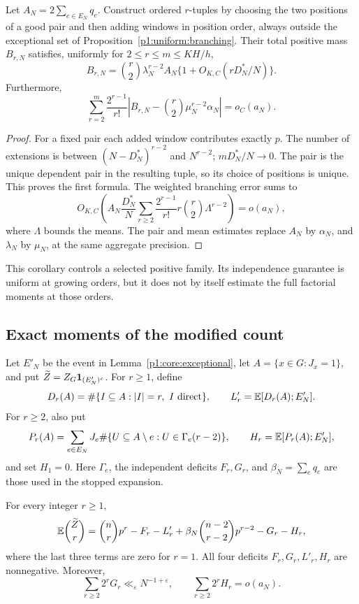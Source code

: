 \begin{corollary}
\label{p1:uniform:one-pair}
Let \(A_N=2\sum_{e\in E_N}q_e\).
Construct ordered \(r\)-tuples by choosing the
two positions of a good pair and then adding
windows in position order, always outside the
exceptional set of
Proposition~\ref{p1:uniform:branching}.
Their total positive mass \(B_{r,N}\) satisfies,
uniformly for \(2\le r\le m\le KH/h\),
\[
 B_{r,N}=\binom r2\lambda_N^{r-2}A_N
                       \{1+O_{K,C}(rD_N^*/N)\}.
\]
Furthermore,
\[
 \sum_{r=2}^{m}\frac{2^{r-1}}{r!}
   \left|B_{r,N}-\binom r2\mu_N^{r-2}\alpha_N\right|
       =o_C(a_N).
\]
\end{corollary}

\begin{proof}
For a fixed pair each added window contributes
exactly \(p\). The number of extensions is
between \((N-D_N^*)^{r-2}\) and \(N^{r-2}\);
\(mD_N^*/N\to0\). The pair is the unique
dependent pair in the resulting tuple, so its
choice of positions is unique. This proves the
first formula.
The weighted branching error sums to
\[
 O_{K,C}\left(A_N\frac{D_N^*}{N}
       \sum_{r\ge2}\frac{2^{r-1}}{r!}
                r\binom r2\Lambda^{r-2}\right)=o(a_N),
\]
where \(\Lambda\) bounds the means.
The pair and mean estimates replace \(A_N\)
by \(\alpha_N\), and \(\lambda_N\) by \(\mu_N\),
at the same aggregate precision.
\end{proof}

This corollary controls a selected positive family.
Its independence guarantee is uniform at growing
orders, but it does not by itself estimate the full
factorial moments at those orders.

\subsection{Exact moments of the modified count}

Let \(E'_N\) be the event in Lemma~\ref{p1:core:exceptional},
let \(A=\{x\in G:J_x=1\}\), and put
\(\widetilde Z=Z_G\mathbf 1_{(E'_N)^c}\).
For \(r\ge1\), define
\[
 D_r(A)=\#\{I\subseteq A:|I|=r,\ I\text{ direct}\},
 \qquad L'_r=\E[D_r(A);E'_N].
\]
For \(r\ge2\), also put
\[
 P_r(A)=\sum_{e\in E_N}J_e
       \#\{U\subseteq A\setminus e:U\in\Gamma_e(r-2)\},
 \qquad H_r=\mathbb E[P_r(A);E'_N],
\]
and set \(H_1=0\).
Here \(\Gamma_e\), the independent deficits \(F_r,G_r\),
and \(\beta_N=\sum_eq_e\) are those used in the
stopped expansion.

\begin{proposition}
\label{p1:uniform:modified-moments}
For every integer \(r\ge1\),
\begin{equation}
 \mathbb E\binom{\widetilde Z}{r}
   =\binom nrp^r-F_r-L'_r
     +\beta_N\binom{n-2}{r-2}p^{r-2}-G_r-H_r,
 \label{p1:uniform:modified-identity}
\end{equation}
where the last three terms are zero for \(r=1\).
All four deficits \(F_r,G_r,L'_r,H_r\) are
nonnegative. Moreover,
\[
 \sum_{r\ge2}2^rG_r
       \ll_\varepsilon N^{-1+\varepsilon},
 \qquad
 \sum_{r\ge2}2^rH_r=o(a_N).
\]
\end{proposition}

